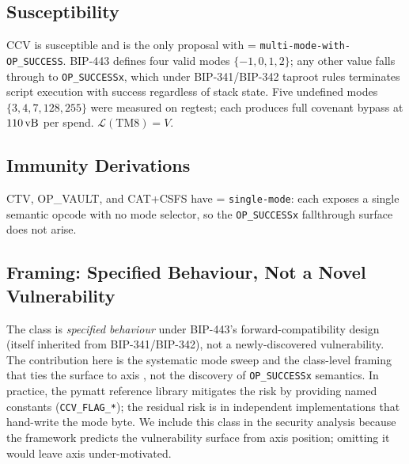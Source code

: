 \subsection{Susceptibility}
CCV is susceptible and is the only proposal with \axopsurf{} =
\texttt{multi-mode-with-OP\_SUCCESS}. BIP-443 defines four valid
modes $\{-1, 0, 1, 2\}$; any other value falls through to
\texttt{OP\_SUCCESSx}, which under BIP-341/BIP-342 taproot rules
terminates script execution with success regardless of stack state.
Five undefined modes $\{3, 4, 7, 128, 255\}$ were measured on
regtest; each produces full covenant bypass at $110\,\text{vB}{}$ per spend.
$\mathcal{L}(\mathrm{TM8}) = V$.

\subsection{Immunity Derivations}
CTV, OP\_VAULT, and CAT+CSFS have \axopsurf{} = \texttt{single-mode}:
each exposes a single semantic opcode with no mode selector, so the
\texttt{OP\_SUCCESSx} fallthrough surface does not arise.

\subsection{Framing: Specified Behaviour, Not a Novel Vulnerability}
The class is \emph{specified behaviour} under BIP-443's
forward-compatibility design (itself inherited from BIP-341/BIP-342),
not a newly-discovered vulnerability. The contribution here is the
systematic mode sweep and the class-level framing that ties the
surface to axis \axopsurf{}, not the discovery of
\texttt{OP\_SUCCESSx} semantics. In practice, the pymatt reference
library mitigates the risk by providing named constants
(\texttt{CCV\_FLAG\_*}); the residual risk is in independent
implementations that hand-write the mode byte. We include this class
in the security analysis because the framework predicts the
vulnerability surface from axis position; omitting it would leave
axis \axopsurf{} under-motivated.

